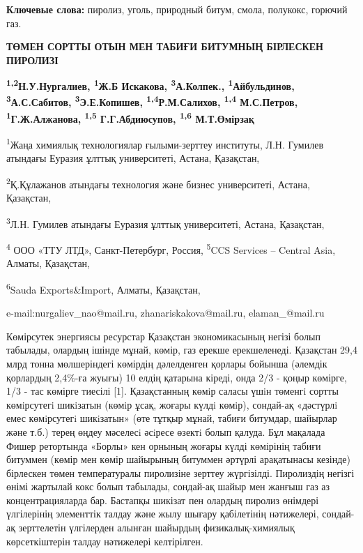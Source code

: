 {\bfseries Ключевые слова:} пиролиз, уголь, природный битум, смола,
полукокс, горючий газ.

\begin{center}
{\large\bfseries ТӨМЕН СОРТТЫ ОТЫН МЕН ТАБИҒИ БИТУМНЫҢ БІРЛЕСКЕН ПИРОЛИЗІ}

{\bfseries \textsuperscript{1,2}Н.У.Нургалиев\envelope, \textsuperscript{1}Ж.Б
Искакова\envelope, \textsuperscript{3}А.Колпек., \textsuperscript{1}Айбульдинов\envelope, \textsuperscript{3}А.С.Сабитов, \textsuperscript{3}Э.Е.Копишев, \textsuperscript{1,4}Р.М.Салихов, \textsuperscript{1,4} М.С.Петров, \textsuperscript{1}Г.Ж.Алжанова, \textsuperscript{1,5} Г.Г.Абдиюсупов, \textsuperscript{1,6}
М.Т.Өмірзақ}

\textsuperscript{1}Жаңа химиялық технологиялар ғылыми-зерттеу институты,
Л.Н. Гумилев атындағы Еуразия ұлттық университеті, Астана, Қазақстан,

\textsuperscript{2}Қ.Құлажанов атындағы технология және бизнес
университеті, Астана, Қазақстан,

\textsuperscript{3}Л.Н. Гумилев атындағы Еуразия ұлттық университеті,
Астана, Қазақстан,

\textsuperscript{4} ООО «ТТУ ЛТД», Санкт-Петербург, Россия,
\textsuperscript{5}CCS Services -- Central Asia, Алматы, Қазақстан,

\textsuperscript{6}Sauda Exports\&Import, Алматы, Қазақстан,

e-mail:nurgaliev\_nao@mail.ru, zhanariskakova@mail.ru, elaman\_@mail.ru
\end{center}

Көмірсутек энергиясы ресурстар Қазақстан экономикасының негізі болып
табылады, олардың ішінде мұнай, көмір, газ ерекше ерекшеленеді.
Қазақстан 29,4 млрд тонна мөлшеріндегі көмірдің дәлелденген қорлары
бойынша (әлемдік қорлардың 2,4\%-ға жуығы) 10 елдің қатарына кіреді,
онда 2/3 - қоңыр көмірге, 1/3 - тас көмірге тиесілі {[}1{]}.
Қазақстанның көмiр саласы үшiн төменгi сортты көмiрсутегi шикiзатын
(көмiр ұсақ, жоғары күлдi көмiр), сондай-ақ «дәстүрлi емес көмiрсутегi
шикiзатын» (өте тұтқыр мұнай, табиғи битумдар, шайырлар және т.б.) терең
өңдеу мәселесi әсiресе өзектi болып қалуда. Бұл мақалада Фишер
ретортында «Борлы» кен орнының жоғары күлді көмірінің табиғи битуммен
(көмір мен көмір шайырының битуммен әртүрлі арақатынасы кезінде)
бірлескен төмен температуралы пиролизіне зерттеу жүргізілді. Пиролиздің
негізгі өнімі жартылай кокс болып табылады, сондай-ақ шайыр мен жанғыш
газ аз концентрацияларда бар. Бастапқы шикізат пен олардың пиролиз
өнімдері үлгілерінің элементтік талдау және жылу шығару қабілетінің
нәтижелері, сондай-ақ зерттелетін үлгілерден алынған шайырдың
физикалық-химиялық көрсеткіштерін талдау нәтижелері келтірілген.

